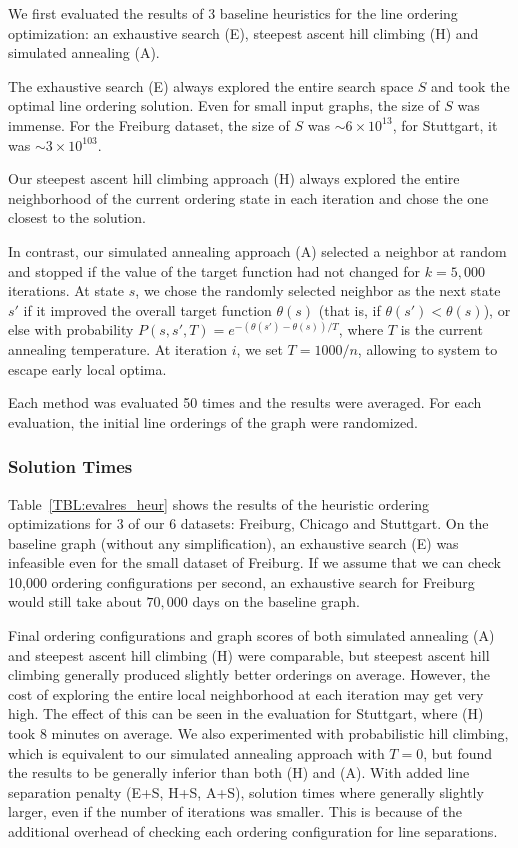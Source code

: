 \documentclass[format=acmsmall, review=false, screen=true]{acmart}
\begin{document}
We first evaluated the results of 3 baseline heuristics for the line ordering optimization: an exhaustive search (E), steepest ascent hill climbing (H) and simulated annealing (A).

The exhaustive search (E) always explored the entire search space $S$ and took the optimal line ordering solution.
Even for small input graphs, the size of $S$ was immense. For the Freiburg dataset, the size of $S$ was $\sim 6 \times 10^{13}$, for Stuttgart, it was $\sim 3 \times 10^{103}$.

Our steepest ascent hill climbing approach (H) always explored the entire neighborhood of the current ordering state in each iteration and chose the one closest to the solution.

In contrast, our simulated annealing approach (A) selected a neighbor at random and stopped if the value of the target function had not changed for $k = 5,000$ iterations.
At state $s$, we chose the randomly selected neighbor as the next state $s'$ if it improved the overall target function $\theta(s)$ (that is, if $\theta(s') < \theta(s)$), or else with probability $P(s, s', T) = e^{-(\theta(s') - \theta(s)) / T}$, where $T$ is the current annealing temperature.
At iteration $i$, we set $T = 1000 / n$, allowing to system to escape early local optima.

Each method was evaluated 50 times and the results were averaged.
For each evaluation, the initial line orderings of the graph were randomized.

\subsubsection{Solution Times} Table~\ref{TBL:evalres_heur} shows the results of the heuristic ordering optimizations for 3 of our 6 datasets: Freiburg, Chicago and Stuttgart.
On the baseline graph (without any simplification), an exhaustive search (E) was infeasible even for the small dataset of Freiburg.
If we assume that we can check 10,000 ordering configurations per second, an exhaustive search for Freiburg would still take about $70,000$ days on the baseline graph.

Final ordering configurations and graph scores of both simulated annealing (A) and steepest ascent hill climbing (H) were comparable, but steepest ascent hill climbing generally produced slightly better orderings on average.
However, the cost of exploring the entire local neighborhood at each iteration may get very high.
The effect of this can be seen in the evaluation for Stuttgart, where (H) took 8 minutes on average.
We also experimented with probabilistic hill climbing, which is equivalent to our simulated annealing approach with $T = 0$, but found the results to be generally inferior than both (H) and (A).
With added line separation penalty (E+S, H+S, A+S), solution times where generally slightly larger, even if the number of iterations was smaller.
This is because of the additional overhead of checking each ordering configuration for line separations.
\end{document}
